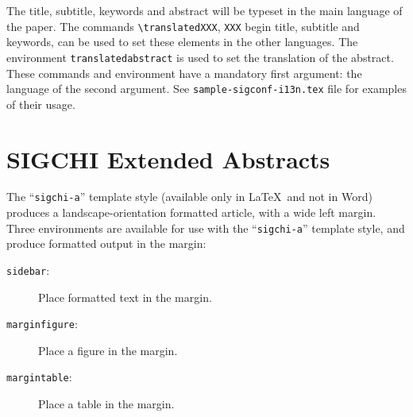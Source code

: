 The title, subtitle, keywords and abstract will be typeset in the main
language of the paper.  The commands \verb|\translatedXXX|, \verb|XXX|
begin title, subtitle and keywords, can be used to set these elements
in the other languages.  The environment \verb|translatedabstract| is
used to set the translation of the abstract.  These commands and
environment have a mandatory first argument: the language of the
second argument.  See \verb|sample-sigconf-i13n.tex| file for examples
of their usage.

\section{SIGCHI Extended Abstracts}

The ``\verb|sigchi-a|'' template style (available only in \LaTeX\ and
not in Word) produces a landscape-orientation formatted article, with
a wide left margin. Three environments are available for use with the
``\verb|sigchi-a|'' template style, and produce formatted output in
the margin:
\begin{description}
\item[\texttt{sidebar}:]  Place formatted text in the margin.
\item[\texttt{marginfigure}:] Place a figure in the margin.
\item[\texttt{margintable}:] Place a table in the margin.
\end{description}
